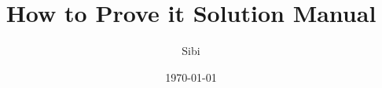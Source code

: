 \documentclass{exam}
\begin{document}
\printanswers

\title{How to Prove it Solution Manual}
\author{Sibi}
\date{\today}
\maketitle

\tableofcontents

\begin{questions}
%


%
%
%
%
\end{questions}
\end{document}
